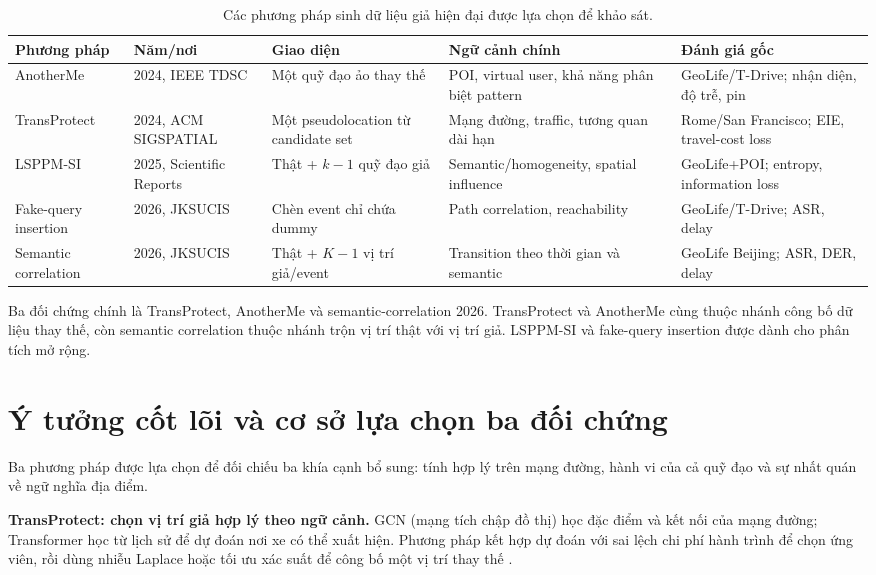 \documentclass[12pt,a4paper,oneside]{report}
\begin{document}
\begin{table}[htbp]
\centering
\footnotesize
\caption{Các phương pháp sinh dữ liệu giả hiện đại được lựa chọn để khảo sát.}
\label{tab:sota}
\begin{tabularx}{\textwidth}{P{2.35cm}P{2.05cm}P{3.0cm}Y P{3.0cm}}
\toprule
\textbf{Phương pháp} & \textbf{Năm/nơi} & \textbf{Giao diện} & \textbf{Ngữ cảnh chính} & \textbf{Đánh giá gốc} \\
\midrule
AnotherMe & 2024, IEEE TDSC & Một quỹ đạo ảo thay thế & POI, virtual user, khả năng phân biệt pattern & GeoLife/T-Drive; nhận diện, độ trễ, pin \\
\addlinespace
TransProtect & 2024, ACM SIGSPATIAL & Một pseudolocation từ candidate set & Mạng đường, traffic, tương quan dài hạn & Rome/San Francisco; EIE, travel-cost loss \\
\addlinespace
LSPPM-SI & 2025, Scientific Reports & Thật + $k-1$ quỹ đạo giả & Semantic/homogeneity, spatial influence & GeoLife+POI; entropy, information loss \\
\addlinespace
Fake-query insertion & 2026, JKSUCIS & Chèn event chỉ chứa dummy & Path correlation, reachability & GeoLife/T-Drive; ASR, delay \\
\addlinespace
Semantic correlation & 2026, JKSUCIS & Thật + $K-1$ vị trí giả/event & Transition theo thời gian và semantic & GeoLife Beijing; ASR, DER, delay \\
\bottomrule
\end{tabularx}
\end{table}

Ba đối chứng chính là TransProtect, AnotherMe và semantic-correlation 2026. TransProtect và AnotherMe cùng thuộc nhánh công bố dữ liệu thay thế, còn semantic correlation thuộc nhánh trộn vị trí thật với vị trí giả. LSPPM-SI và fake-query insertion được dành cho phân tích mở rộng.

\clearpage
\section{Ý tưởng cốt lõi và cơ sở lựa chọn ba đối chứng}
\label{sec:comparator-rationale}

Ba phương pháp được lựa chọn để đối chiếu ba khía cạnh bổ sung: tính hợp lý trên mạng đường, hành vi của cả quỹ đạo và sự nhất quán về ngữ nghĩa địa điểm.

\noindent\textbf{TransProtect: chọn vị trí giả hợp lý theo ngữ cảnh.}
GCN (mạng tích chập đồ thị) học đặc điểm và kết nối của mạng đường; Transformer học từ lịch sử để dự đoán nơi xe có thể xuất hiện. Phương pháp kết hợp dự đoán với sai lệch chi phí hành trình để chọn ứng viên, rồi dùng nhiễu Laplace hoặc tối ưu xác suất để công bố một vị trí thay thế \citep{yadav2024transprotect}.
\end{document}
